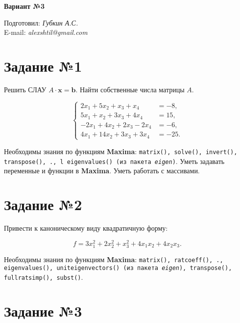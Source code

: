 \begin{center}
    \textbf{\huge Вариант №3}
\end{center}

\begin{flushright}
    Подготовил: \textit{Губкин А.С.}\\
    E-mail: \textit{alexshtil@gmail.com}\\
\end{flushright}

\section*{Задание №1}

    Решить СЛАУ $A \cdot \mathbf{x} = \mathbf{b}$. Найти собственные числа матрицы $A$.

    \[
        \left\{
            \begin{aligned}
                2 x_{1} + 5 x_{2} + x_{3} + x_{4} &= -8,\\
                5 x_{1} + x_{2} + 3 x_{3} + 4 x_{4} &= 15,\\
                -2 x_{1} + 4 x_{2} + 2 x_{3} - 2 x_{4} &= -6,\\
                4 x_{1} + 14 x_{2} + 3 x_{3} + 3 x_{4} &= -25.
            \end{aligned}
        \right.
    \]

    Необходимы знания по функциям \textbf{Maxima}: {\tt matrix(), solve(), invert(), transpose(), ., ^^, eigenvalues() (из пакета \textit{eigen})}. Уметь задавать переменные и функции в \textbf{Maxima}. Уметь работать с массивами.

\section*{Задание №2}

    Привести к каноническому виду квадратичную форму: 

    \[
        f = 3 x^{2}_{1} + 2 x^{2}_{2} + x^{2}_{3} + 4 x_{1} x_{2} + 4 x_{2} x_{3}.
    \]

    Необходимы знания по функциям \textbf{Maxima}: {\tt matrix(), ratcoeff(), ., eigenvalues(), uniteigenvectors() (из пакета \textit{eigen}), transpose(), fullratsimp(), subst()}.

\section*{Задание №3}

